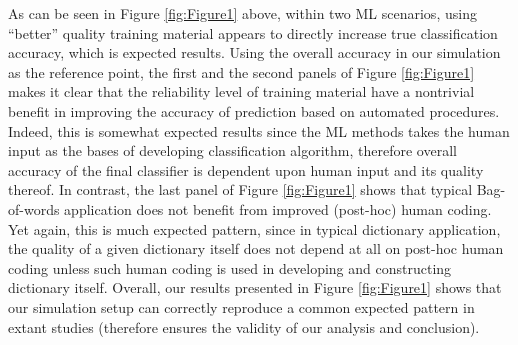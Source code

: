 \documentclass[man, 12pt, a4paper, nolmodern, noextraspace]{apa6}
\begin{document}
As can be seen in Figure \ref{fig:Figure1} above, within two ML scenarios, using \enquote{better} quality training material appears to directly increase true classification accuracy, which is expected results. Using the overall accuracy in our simulation as the reference point, the first and the second panels of Figure \ref{fig:Figure1} makes it clear that the reliability level of training material have a nontrivial benefit in improving the accuracy of prediction based on automated procedures. Indeed, this is somewhat expected results since the ML methods takes the human input as the bases of developing classification algorithm, therefore overall accuracy of the final classifier is dependent upon human input and its quality thereof. In contrast, the last panel of Figure \ref{fig:Figure1} shows that typical Bag-of-words application does not benefit from improved (post-hoc) human coding. Yet again, this is much expected pattern, since in typical dictionary application, the quality of a given dictionary itself does not depend at all on post-hoc human coding unless such human coding is used in developing and constructing dictionary itself. Overall, our results presented in Figure \ref{fig:Figure1} shows that our simulation setup can correctly reproduce a common expected pattern in extant studies (therefore ensures the validity of our analysis and conclusion).   
\end{document}
